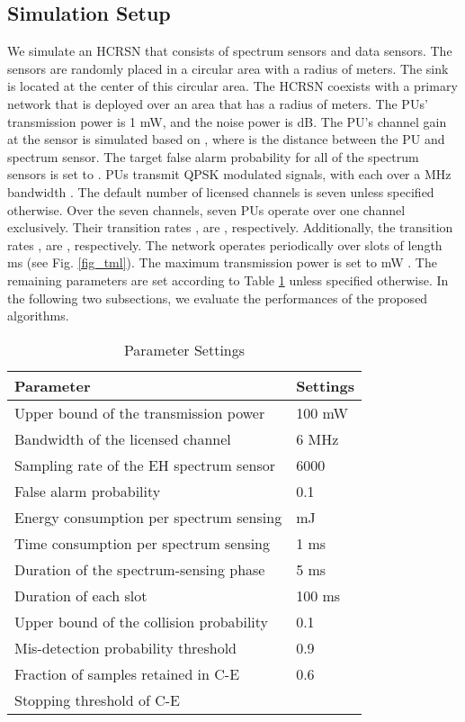\documentclass[journal]{IEEEtran} \ifCLASSINFOpdf
\begin{document}
\subsection{Simulation Setup} \label{sec:par_setting}
We simulate an HCRSN that consists of  spectrum sensors and  data sensors. The sensors are randomly placed in a circular area with a radius of  meters. The sink is located at the center of this circular area. The HCRSN coexists with a primary network that is deployed over an area that has a radius of  meters. The PUs' transmission power is 1 mW, and the noise power is  dB. The PU's channel gain at the sensor is simulated based on , where  is the distance between the PU and spectrum sensor. The target false alarm probability for all of the spectrum sensors  is set to . PUs transmit QPSK modulated signals, with each over a  MHz bandwidth . The default number of licensed channels is seven unless specified otherwise. Over the seven channels, seven PUs operate over one channel exclusively. Their transition rates , are , respectively. Additionally, the transition rates , are , respectively. The network operates periodically over slots of length  ms \cite{Pei2011} (see Fig. \ref{fig_tml}). The maximum transmission power is set to  mW \cite{Shu2006}. The remaining parameters are set according to Table \ref{table.parametersettings} unless specified otherwise. In the following two subsections, we evaluate the performances of the proposed algorithms.

\begin{table}[!t]
    \caption{Parameter Settings}
    \centering
    \small
    \begin{tabular}{p{6.5cm}|p{1.3cm}}
         \hline
         \hline \textbf{Parameter} & \textbf{Settings} \\
         \hline
         \hline
         Upper bound of the transmission power  & 100 mW\\
         Bandwidth of the licensed channel  \cite{Zhang2014} & 6 MHz\\
         Sampling rate of the EH spectrum sensor  \cite{Liang2008}  & 6000\\
         False alarm probability  & 0.1  \\
         Energy consumption per spectrum sensing  &  mJ\\ Time consumption per spectrum sensing    & 1 ms   \\
         Duration of the spectrum-sensing phase    & 5 ms   \\
         Duration of each slot  \cite{Pei2011} & 100 ms \\
         Upper bound of the collision probability  & 0.1 \\
         Mis-detection probability threshold  & 0.9 \\
         Fraction of samples retained in C-E  & 0.6 \\
         Stopping threshold of C-E  &  \\
         \hline
    \end{tabular}
    \label{table.parametersettings}
\end{table}
\end{document}
